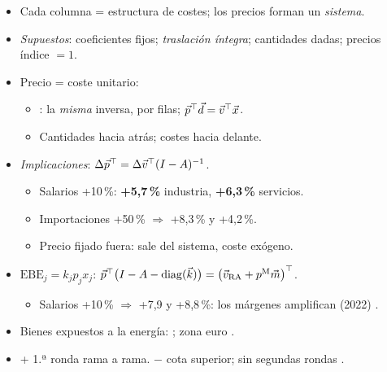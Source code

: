\documentclass{article}
\begin{document}
\begin{columnas}
\begin{itemize}
\item Cada columna = estructura de costes; los precios forman un \emph{sistema}.
\item \emph{Supuestos}: coeficientes fijos; \emph{traslación íntegra}; cantidades dadas; precios índice $=1$.
\item Precio = coste unitario:
  \begin{itemize}
  \item {}: la \emph{misma} inversa, por filas; $\vec{p}^{\top}\vec{d}=\vec{v}^{\top}\vec{x}$.
  \item Cantidades hacia atrás; costes hacia delante.
  \end{itemize}
\item \emph{Implicaciones}: $\Delta\vec{p}^{\top}=\Delta\vec{v}^{\top}(I-A)^{-1}$.
  \begin{itemize}
  \item Salarios +10\,\%: \textbf{+5,7\,\%} industria, \textbf{+6,3\,\%} servicios.
  \item Importaciones +50\,\% $\Rightarrow$ +8,3\,\% y +4,2\,\%.
  \item Precio fijado fuera: sale del sistema, coste exógeno.
  \end{itemize}
\end{itemize}
\begin{itemize}
\item $\mathrm{EBE}_j=k_jp_jx_j$: $\vec{p}^{\top}\bigl(I-A-\operatorname{diag}(\vec{k})\bigr)=\bigl(\vec{v}_{\mathrm{RA}}+p^{\mathrm M}\vec{m}\bigr)^{\top}$.
  \begin{itemize}
  \item Salarios +10\,\% $\Rightarrow$ +7,9 y +8,8\,\%: los márgenes amplifican (2022) .
  \end{itemize}
\end{itemize}
\begin{itemize}
\item Bienes expuestos a la energía: ; zona euro .
\item + 1.ª ronda rama a rama. $-$ cota superior; sin segundas rondas .
\end{itemize}


\end{columnas}
\end{document}
